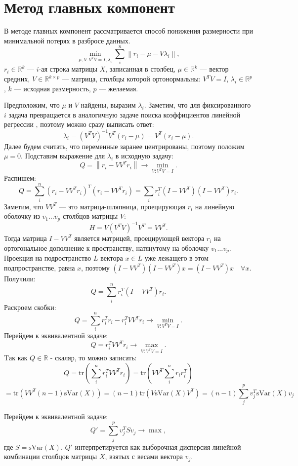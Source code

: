 \documentclass[12pt]{article} %
\theoremstyle{definition} %
\begin{document}
\section{Метод главных компонент}
В методе главных компонент рассматривается способ понижения размерности при минимальной потерях в разбросе данных.
$$\min_{\mu, V: V^TV=I, \lambda_i} \sum_{i}^n \left\|r_i - \mu - V\lambda_i \right\|, $$
$r_i \in \mathbb{R}^k$ — $i$-ая строка матрицы $X$, записанная в столбец,
$\mu \in \mathbb{R}^k$ — вектор средних, $V \in \mathbb{R}^{k \times p}$  —  матрица, столбцы которой ортонормальны: $V^TV=I$, $\lambda_i \in \mathbb{R}^p$, $k$  —  исходная размерность, $p$  —  желаемая.

Предположим, что $\mu$ и $V$ найдены, выразим $\lambda_i$. Заметим, что для фиксированного $i$ задача превращается в аналогичную задаче поиска коэффициентов линейной регрессии , поэтому можно сразу выписать ответ:
$$\lambda_i = (V^TV)^{-1}V^T(r_i-\mu) = V^T(r_i-\mu).$$
Далее будем считать, что переменные заранее центрированы, поэтому положим $\mu=0$.
Подставим выражение для $\lambda_i$ в исходную задачу:
$$Q = \left\| r_i - VV^T r_i \right\| \to \min_{V: V^TV=I} .$$
Распишем:
$$Q = \sum_i^n (r_i - VV^Tr_i)^T (r_i - VV^Tr_i) =
\sum_i r_i^T (I-VV^T)(I-VV^T)r_i.$$
Заметим, что $VV^T$  —  это матрица-шляпница, проецирующая $r_i$ на линейную оболочку из $v_1 \dots v_p$ столбцов матрицы $V$:
$$H = V (V^TV)^{-1} V^T = VV^T.$$
Тогда матрица $I-VV^T$ является матрицей, проецирующей вектора $r_i$ на ортогональное дополнение к пространству, натянутому на оболочку $v_1 \dots v_p$.
Проекция на подространство $L$ вектора $x \in L$ уже лежащего в этом подпространстве, равна $x$, поэтому  $(I-VV^T)(I-VV^T)x=(I-VV^T)x \quad \forall x$.
Получили:
$$Q = \sum_i^n r_i^T(I - VV^T)r_i.$$
Раскроем скобки:
$$Q = \sum_i^n r_i^T r_i - r_i^T VV^T r_i \to \min_{V: V^TV=I}.$$
Перейдем к эквивалентной задаче:
$$Q=r_i^T VV^T r_i \to \max_{V: V^TV=I}.$$
Tак как $Q \in \mathbb{R}$ - скаляр, то можно записать:
$$Q = \text{tr} (\sum_i^n r_i^T VV^T r_i ) =
 \text{tr} (VV^T \sum_i^n r_i r_i^T) $$
 $$
 = \text{tr} (VV^T (n-1)\text{sVar}(X))=
 (n-1)\text{tr} (V \text{sVar}(X) V^T )
 = (n-1) \sum_{j}^p v_j^T \text{sVar}(X) v_j $$

Перейдем к эквивалентной задаче:
$$Q' = \sum_{j}^p v_j^T S v_j \to \max,$$
где $S = \text{sVar}(X)$. $Q'$ интерпретируется как выборочная дисперсия линейной комбинации столбцов матрицы $X$, взятых с весами вектора $v_j$.
\end{document}
